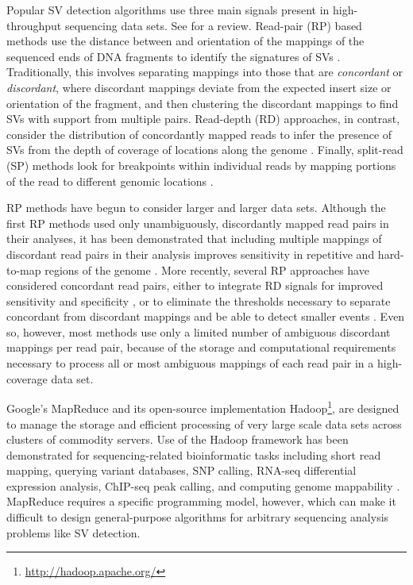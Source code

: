 \documentclass[11pt]{article}
\begin{document}
Popular SV detection algorithms use three main signals present in high-throughput sequencing data sets. See \textcite{Alkan:2011p547} for a review. Read-pair (RP) based methods use the distance between and orientation of the mappings of the sequenced ends of DNA fragments to identify the signatures of SVs \autocite{Campbell:2008p539,Chen:2009p3,Hormozdiari:2009p284,Sindi:2009gu,Korbel:2009dy}. Traditionally, this involves separating mappings into those that are \emph{concordant} or \emph{discordant}, where discordant mappings deviate from the expected insert size or orientation of the fragment, and then clustering the discordant mappings to find SVs with support from multiple pairs. Read-depth (RD) approaches, in contrast, consider the distribution of concordantly mapped reads to infer the presence of SVs from the depth of coverage of locations along the genome \autocite{Abyzov:2011bk,Alkan:2009cr,Yoon:2009kb,Chiang:2009di}. Finally, split-read (SP) methods look for breakpoints within individual reads by mapping portions of the read to different genomic locations \autocite{Wang:2011p1607,Ye:2009p2}.

RP methods have begun to consider larger and larger data sets. Although the first RP methods used only unambiguously, discordantly mapped read pairs in their analyses, it has been demonstrated that including multiple mappings of discordant read pairs in their analysis improves sensitivity in repetitive and hard-to-map regions of the genome \autocite{Hormozdiari:2009p284,Quinlan:2010gf}. More recently, several RP approaches have considered concordant read pairs, either to integrate RD signals for improved sensitivity and specificity \autocite{Sindi:2012kk,Michaelson:2012fj,Chiara:2012ey}, or to eliminate the thresholds necessary to separate concordant from discordant mappings and be able to detect smaller events \autocite{Marschall:2012ek}. Even so, however, most methods use only a limited number of ambiguous discordant mappings per read pair, because of the storage and computational requirements necessary to process all or most ambiguous mappings of each read pair in a high-coverage data set.

Google's MapReduce \autocite{Dean:2008p277} and its open-source implementation Hadoop\footnote{\url{http://hadoop.apache.org/}}, are designed to manage the storage and efficient processing of very large scale data sets across clusters of commodity servers. Use of the Hadoop framework has been demonstrated for sequencing-related bioinformatic tasks including short read mapping, \autocite{Schatz:2009p278} querying variant databases, \autocite{Oconnor:2010p1835} SNP calling, \autocite{Langmead:2009p1225} RNA-seq differential expression analysis, \autocite{Langmead:2010p1268} ChIP-seq peak calling, \autocite{Feng:2011p1228} and computing genome mappability \autocite{Lee:2012bk}. MapReduce requires a specific programming model, however, which can make it difficult to design general-purpose algorithms for arbitrary sequencing analysis problems like SV detection.
\end{document}
